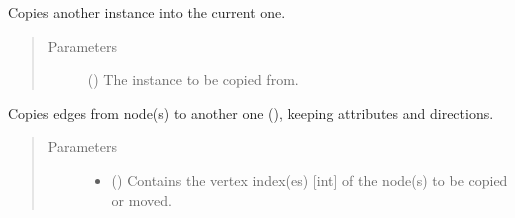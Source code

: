 \documentclass[letterpaper,10pt,english]{sphinxmanual}
\begin{document}
\begin{fulllineitems}
\begin{fulllineitems}
\begin{quote}
\begin{description}
\end{description}\end{quote}

\end{fulllineitems}


\begin{fulllineitems}
\label{\detokenize{main:pypath.main.PyPath.consistency}}
\end{fulllineitems}


\begin{fulllineitems}
\label{\detokenize{main:pypath.main.PyPath.copy}}
Copies another {\hyperref[\detokenize{main:pypath.main.PyPath}]{}} instance into the
current one.
\begin{quote}\begin{description}
\item[{Parameters}] \leavevmode
{} ({\hyperref[\detokenize{main:pypath.main.PyPath}]{}}) \textendash{} The instance to be copied from.

\end{description}\end{quote}

\end{fulllineitems}


\begin{fulllineitems}
\label{\detokenize{main:pypath.main.PyPath.copy_edges}}
Copies edges from  node(s) to another one (),
keeping attributes and directions.
\begin{quote}\begin{description}
\item[{Parameters}] \leavevmode\begin{itemize}
\item {} 
 () \textendash{} Contains the vertex index(es) {[}int{]} of the node(s) to be
copied or moved.


\end{itemize}
\end{description}
\end{quote}
\end{fulllineitems}
\end{fulllineitems}
\end{document}
